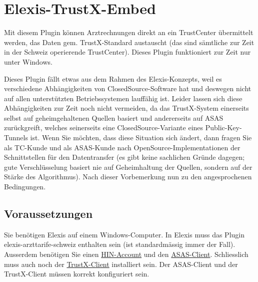 
\section{Elexis-TrustX-Embed }
Mit diesem Plugin können Arztrechnungen direkt an ein TrustCenter übermittelt werden, das Daten gem. TrustX-Standard austauscht (das sind sämtliche zur Zeit in der Schweiz operierende TrustCenter). Dieses Plugin funktioniert zur Zeit nur unter Windows.

Dieses Plugin fällt etwas aus dem Rahmen des Elexis-Konzepts, weil es verschiedene Abhängigkeiten von ClosedSource-Software hat und deswegen nicht auf allen unterstützten Betriebssystemen lauffähig ist. Leider lassen sich diese Abhängigkeiten zur Zeit noch nicht vermeiden, da das TrustX-System einerseits selbst auf geheimgehaltenen Quellen basiert und andererseits auf ASAS zurückgreift, welches seinerseits eine ClosedSource-Variante eines Public-Key-Tunnels ist.
Wenn Sie möchten, dass diese Situation sich ändert, dann fragen Sie als TC-Kunde und als ASAS-Kunde nach OpenSource-Implementationen der Schnittstellen für den Datentransfer (es gibt keine sachlichen Gründe dagegen; gute Verschlüsselung basiert nie auf Geheimhaltung der Quellen, sondern auf der Stärke des Algorithmus).
Nach dieser Vorbemerkung nun zu den angesprochenen Bedingungen.

\subsection{Voraussetzungen}
Sie benötigen Elexis auf einem Windows-Computer. In Elexis muss das Plugin elexis-arzttarife-schweiz  enthalten sein (ist standardmässig immer der Fall). Ausserdem benötigen Sie einen \href{http://www.hin.ch}{HIN-Account} und den \href{http://www.hin.ch/asas}{ASAS-Client}. Schliesslich muss auch noch der \href{http://www.trustx.ch/trustx-praxis/documents/setup-2_1_14.exe}{TrustX-Client} installiert sein. Der ASAS-Client und der TrustX-Client müssen korrekt konfiguriert sein.

